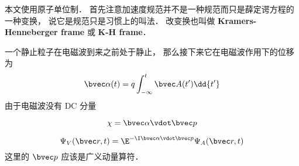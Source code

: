 

本文使用原子单位制． 首先注意加速度规范并不是一种规范而只是薛定谔方程的一种变换， 说它是规范只是习惯上的叫法． 改变换也叫做 \textbf{Kramers-Henneberger frame} 或 \textbf{K-H frame}．

一个静止粒子在电磁波到来之前处于静止， 那么接下来它在电磁波作用下的位移为
\begin{equation}
\bvec \alpha(t) = q\int_{-\infty}^t \bvec A(t') \dd{t'}
\end{equation}
由于电磁波没有 DC 分量

\begin{equation}
\chi = \bvec \alpha \vdot \bvec p
\end{equation}

\begin{equation}
\Psi_V(\bvec r, t) = \E^{-\I \bvec \alpha \vdot \bvec p} \Psi_A(\bvec r, t)
\end{equation}
这里的 $\bvec p$ 应该是广义动量算符．
